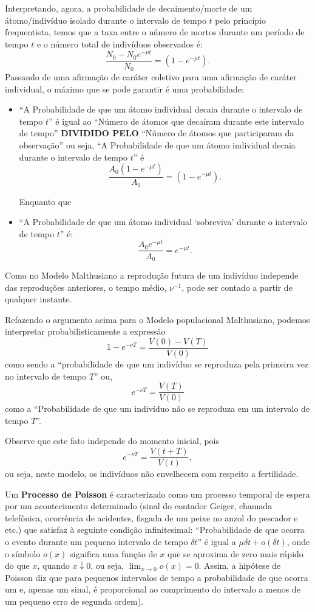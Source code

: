     Interpretando, agora, a probabilidade de decaimento/morte de um átomo/indivíduo isolado durante o intervalo de tempo \(t\) pelo princípio frequentista, temos que a taxa entre o número de mortos durante um período de tempo \(t\) e o número total de indivíduos observados é:
    \[\dfrac{N_0-N_0 e^{-\mu t}}{N_0} = (1-e^{-\mu t}).\]
    Passando de uma afirmação de caráter coletivo para uma afirmação de caráter individual, o máximo que se pode garantir é uma probabilidade:
    \begin{itemize}
    \item ``A Probabilidade de que um átomo individual decaia durante o intervalo de tempo \(t\)'' é igual ao ``Número de átomos que decaíram durante este intervalo de tempo'' \textbf{DIVIDIDO PELO} ``Número de átomos que participaram da observação'' ou seja, ``A Probabilidade de que um átomo individual decaia durante o intervalo de tempo \(t\)'' é
    \[\dfrac{A_0(1-e^{-\mu t})}{A_0} = (1-e^{-\mu t}).\]
    
    Enquanto que
    \item ``A Probabilidade de que um átomo individual `sobreviva' durante o intervalo de tempo \(t\)'' é:
    \[\dfrac{A_0 e^{-\mu t}}{A_0} = e^{-\mu t}.\]
\end{itemize}

    Como no Modelo Malthusiano a reprodução futura de um indivíduo independe das reproduções anteriores, o tempo médio, \(\nu^{-1}\), pode ser contado a partir de qualquer instante.


    Refazendo o argumento acima para o Modelo populacional Malthusiano, podemos interpretar probabilisticamente a expressão
    \[1-e^{-\nu T} = \dfrac{V(0)-V(T)}{V(0)}\]
    como sendo a ``probabilidade de que um indivíduo se reproduza pela primeira vez no intervalo de tempo \(T\)'' ou,
    \[e^{-\nu T} = \dfrac{V(T)}{V(0)}\]
    como a ``Probabilidade de que um indivíduo não se reproduza em um intervalo de tempo \(T\)''.

    Observe que este fato independe do momento inicial, pois
    \[e^{-\nu T} = \dfrac{V(t+T)}{V(t)},\]
    ou seja, neste modelo, os indivíduos não envelhecem com respeito a fertilidade.

    Um \textbf{Processo de Poisson} é caracterizado como um processo temporal de espera por um acontecimento determinado (sinal do contador Geiger, chamada telefônica, ocorrência de acidentes, fisgada de um peixe no anzol do pescador e etc.) que satisfaz à seguinte condição infinitesimal: ``Probabilidade de que ocorra o evento durante um pequeno intervalo de tempo \(\delta t\)'' é igual a \(\mu \delta t + o(\delta t)\), onde o símbolo \(o(x)\) significa uma função de \(x\) que se aproxima de zero mais rápido do que \(x\), quando \(x \downarrow 0\), ou seja, \(\displaystyle\lim_{x \to 0} o(x) = 0\). Assim, a hipótese de Poisson diz que para pequenos intervalos de tempo a probabilidade de que ocorra um e, apenas um sinal, é proporcional ao comprimento do intervalo a menos de um pequeno erro de segunda ordem).

